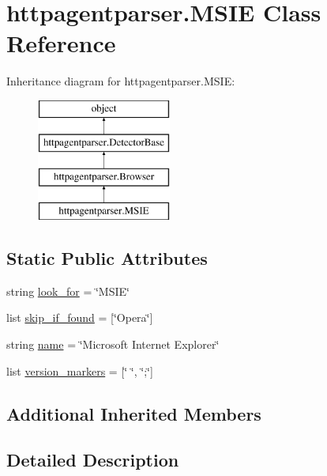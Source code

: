 \hypertarget{classhttpagentparser_1_1_m_s_i_e}{}\section{httpagentparser.\+M\+S\+IE Class Reference}
\label{classhttpagentparser_1_1_m_s_i_e}
Inheritance diagram for httpagentparser.\+M\+S\+IE\+:\begin{figure}[H]
\begin{center}
\leavevmode
\includegraphics[height=4.000000cm]{classhttpagentparser_1_1_m_s_i_e}
\end{center}
\end{figure}
\subsection*{Static Public Attributes}
\begin{DoxyCompactItemize}
\item 
string \hyperlink{classhttpagentparser_1_1_m_s_i_e_aad8e48c3628faa8c3e39ef48cf9838ec}{look\+\_\+for} = \char`\"{}M\+S\+IE\char`\"{}
\item 
list \hyperlink{classhttpagentparser_1_1_m_s_i_e_a950e0dcb4710cb246ad8ec8fd7a44068}{skip\+\_\+if\+\_\+found} = \mbox{[}\char`\"{}Opera\char`\"{}\mbox{]}
\item 
string \hyperlink{classhttpagentparser_1_1_m_s_i_e_ad82616487981705cef28058d0561bea3}{name} = \char`\"{}Microsoft Internet Explorer\char`\"{}
\item 
list \hyperlink{classhttpagentparser_1_1_m_s_i_e_ae1967418e8868b3137cb1090f82587dd}{version\+\_\+markers} = \mbox{[}\char`\"{} \char`\"{}, \char`\"{};\char`\"{}\mbox{]}
\end{DoxyCompactItemize}
\subsection*{Additional Inherited Members}


\subsection{Detailed Description}


